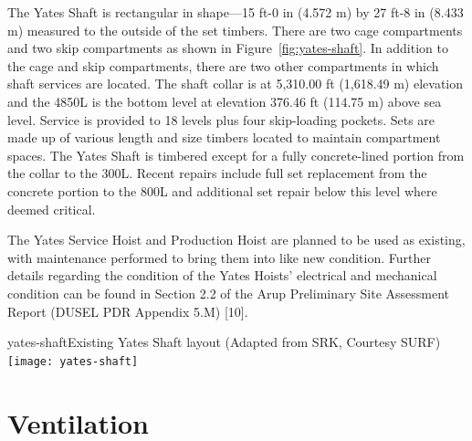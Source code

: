 The Yates Shaft is rectangular in shape—15 ft-0 in (4.572 m) by 27 ft-8 in (8.433 m) measured to the outside of the set timbers. There are two cage compartments and two skip compartments as shown in Figure~\ref{fig:yates-shaft}. In addition to the cage and skip compartments, there are two other compartments in which shaft services are located. The shaft collar is at 5,310.00 ft (1,618.49 m) elevation and the 4850L is the bottom level at elevation 376.46 ft (114.75 m) above sea level. Service is provided to 18 levels plus four skip-loading pockets. Sets are made up of various length and size timbers located to maintain compartment spaces. The Yates Shaft is timbered except for a fully concrete-lined portion from the collar to the 300L. Recent repairs include full set replacement from the concrete portion to the 800L and additional set repair below this level where deemed critical.

The Yates Service Hoist and Production Hoist are planned to be used as existing, with maintenance performed to bring them into like new condition. Further details regarding the condition of the Yates Hoists' electrical and mechanical condition can be found in Section 2.2 of the Arup Preliminary Site Assessment Report (DUSEL PDR Appendix 5.M) [10].

\begin{cdrfigure}{yates-shaft}{Existing Yates Shaft layout (Adapted from SRK, Courtesy SURF)}
\texttt{[image: yates-shaft]}
\end{cdrfigure}



\section{Ventilation}
\label{sec:fscf-und-vent}

